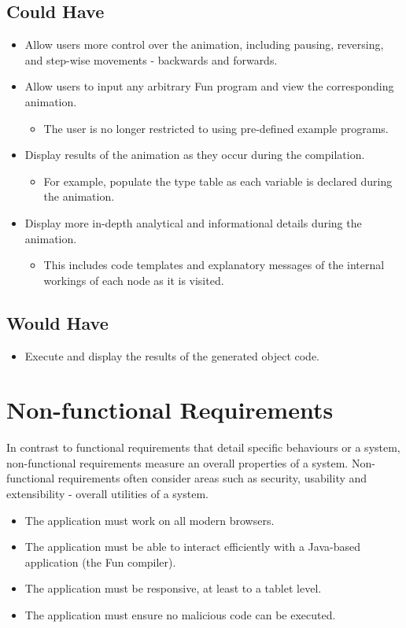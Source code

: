 \documentclass{l4proj}
\begin{document}
\subsection{Could Have}
\begin{itemize}
\item Allow users more control over the animation, including pausing, reversing, and step-wise movements - backwards and forwards.
\item Allow users to input any arbitrary Fun program and view the corresponding animation.
\begin{itemize}
\item The user is no longer restricted to using pre-defined example programs.
\end{itemize}
\item Display results of the animation as they occur during the compilation.
\begin{itemize}
\item For example, populate the type table as each variable is declared during the animation.
\end{itemize}
\item Display more in-depth analytical and informational details during the animation.
\begin{itemize}
\item This includes code templates and explanatory messages of the internal workings of each node as it is visited.
\end{itemize}
\end{itemize}
\subsection{Would Have}
\begin{itemize}
\item Execute and display the results of the generated object code.
\end{itemize}

\section{Non-functional Requirements}
In contrast to functional requirements that detail specific behaviours or a system, non-functional requirements measure an overall properties of a system. Non-functional requirements often consider areas such as security, usability and extensibility - overall utilities of a system.

\begin{itemize}
\item The application must work on all modern browsers.
\item The application must be able to interact efficiently with a Java-based application (the Fun compiler).
\item The application must be responsive, at least to a tablet level.
\item The application must ensure no malicious code can be executed.
\end{itemize}
\end{document}
